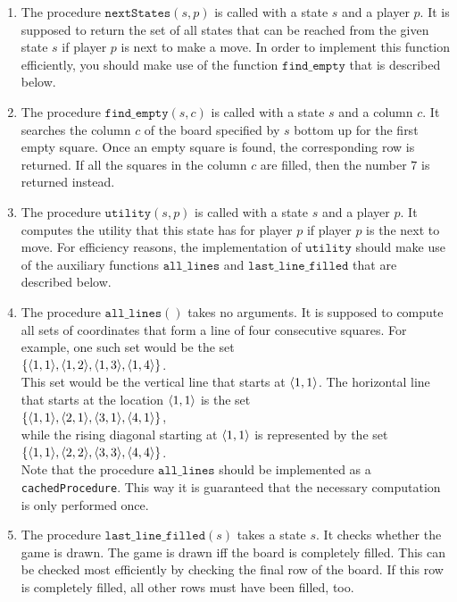 \begin{enumerate}
\item The procedure $\mathtt{nextStates}(s, p)$ is called with a state $s$ and a player $p$.
      It is supposed to return the set of all states that can be reached from the given state $s$ if player $p$
      is next to make a move.  In order to implement this function efficiently, you should make use of the
      function $\mathtt{find\_empty}$ that is described below.  
\item The procedure $\mathtt{find\_empty}(s, c)$ is called with a state $s$ and a column $c$.  It searches the
      column $c$ of the board specified by $s$ bottom up for the first empty square.  Once an empty square is found, 
      the corresponding row is returned.  If all the squares in the column $c$ are filled, then the number $7$
      is returned instead.
\item The procedure $\mathtt{utility}(s, p)$ is called with a state $s$ and a player $p$.
      It computes the utility that this state has for player $p$ if player $p$ is the next to move.
      For efficiency reasons, the implementation of $\mathtt{utility}$ should make use of the auxiliary functions
      $\mathtt{all\_lines}$ and $\mathtt{last\_line\_filled}$ that are described below.
\item The procedure $\mathtt{all\_lines}()$ takes no arguments.  It is supposed to compute all sets of coordinates that form
      a line of four consecutive squares.  For example, one such set would be the set
      \\[0.2cm]
      \hspace*{1.3cm}
      $\{ \pair(1,1), \pair(1,2), \pair(1,3), \pair(1,4) \}$.
      \\[0.2cm]
      This set would be the vertical line that starts at $\pair(1,1)$.  The horizontal line that starts at the
      location  $\pair(1,1)$ is the set
      \\[0.2cm]
      \hspace*{1.3cm}
      $\{ \pair(1,1), \pair(2,1), \pair(3,1), \pair(4,1) \}$,
      \\[0.2cm]
      while the rising diagonal starting at $\pair(1,1)$ is represented by the set
      \\[0.2cm]
      \hspace*{1.3cm}
      $\{ \pair(1,1), \pair(2,2), \pair(3,3), \pair(4,4) \}$.
      \\[0.2cm]
      Note that the procedure $\mathtt{all\_lines}$ should be implemented as a \texttt{cachedProcedure}.  This
      way it is guaranteed that the necessary computation is only performed once.
\item The procedure $\mathtt{last\_line\_filled}(s)$ takes a state $s$.  It checks whether the game is drawn.
      The game is drawn iff the board is completely filled.  This can be checked most efficiently by checking
      the final row of the board.  If this row is completely filled, all other rows must have  been filled, too.
      \eox
\end{enumerate}


